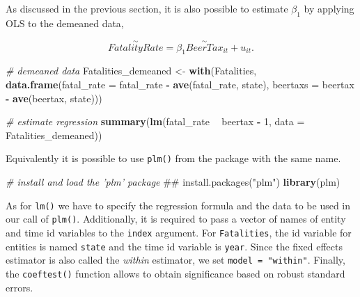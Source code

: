 \documentclass[]{book}
\newenvironment{Shaded}{\begin{snugshade}}{\end{snugshade}}
\newcommand{\KeywordTok}[1]{\textcolor[rgb]{0.13,0.29,0.53}{\textbf{#1}}}
\newcommand{\DataTypeTok}[1]{\textcolor[rgb]{0.13,0.29,0.53}{#1}}
\newcommand{\DecValTok}[1]{\textcolor[rgb]{0.00,0.00,0.81}{#1}}
\newcommand{\StringTok}[1]{\textcolor[rgb]{0.31,0.60,0.02}{#1}}
\newcommand{\CommentTok}[1]{\textcolor[rgb]{0.56,0.35,0.01}{\textit{#1}}}
\newcommand{\OperatorTok}[1]{\textcolor[rgb]{0.81,0.36,0.00}{\textbf{#1}}}
\newcommand{\NormalTok}[1]{#1}
\theoremstyle{definition}
\theoremstyle{definition}
\theoremstyle{definition}
\theoremstyle{remark}
\begin{document}
As discussed in the previous section, it is also possible to estimate
\(\beta_1\) by applying OLS to the demeaned data,

\[\overset{\sim}{FatalityRate} = \beta_1 \overset{\sim}{BeerTax}_{it} + u_{it}. \]

\begin{Shaded}
\begin{Highlighting}[]
\CommentTok{# demeaned data}
\NormalTok{Fatalities_demeaned <-}\StringTok{ }\KeywordTok{with}\NormalTok{(Fatalities,}
            \KeywordTok{data.frame}\NormalTok{(}\DataTypeTok{fatal_rate =}\NormalTok{ fatal_rate }\OperatorTok{-}\StringTok{ }\KeywordTok{ave}\NormalTok{(fatal_rate, state),}
            \DataTypeTok{beertaxs =}\NormalTok{ beertax }\OperatorTok{-}\StringTok{ }\KeywordTok{ave}\NormalTok{(beertax, state)))}

\CommentTok{# estimate regression}
\KeywordTok{summary}\NormalTok{(}\KeywordTok{lm}\NormalTok{(fatal_rate }\OperatorTok{~}\StringTok{ }\NormalTok{beertax }\OperatorTok{-}\StringTok{ }\DecValTok{1}\NormalTok{, }\DataTypeTok{data =}\NormalTok{ Fatalities_demeaned))}
\end{Highlighting}
\end{Shaded}

Equivalently it is possible to use \texttt{plm()} from the package with
the same name.

\begin{Shaded}
\begin{Highlighting}[]
\CommentTok{# install and load the 'plm' package}
\NormalTok{## install.packages("plm")}
\KeywordTok{library}\NormalTok{(plm)}
\end{Highlighting}
\end{Shaded}

As for \texttt{lm()} we have to specify the regression formula and the
data to be used in our call of \texttt{plm()}. Additionally, it is
required to pass a vector of names of entity and time id variables to
the \texttt{index} argument. For \texttt{Fatalities}, the id variable
for entities is named \texttt{state} and the time id variable is
\texttt{year}. Since the fixed effects estimator is also called the
\emph{within} estimator, we set \texttt{model\ =\ "within"}. Finally,
the \texttt{coeftest()} function allows to obtain significance based on
robust standard errors.
\end{document}
